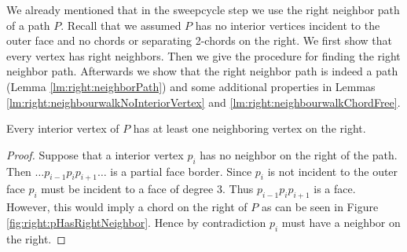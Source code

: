     We already mentioned that in the sweepcycle step we use the right neighbor path of a path $P$. Recall that we assumed $P$ has no interior vertices incident to the outer face and no chords or separating 2-chords on the right.
    We first show that every vertex has right neighbors.
    Then we give the procedure for finding the right neighbor path.
    Afterwards we show that the right neighbor path is indeed a path (Lemma \ref{lm:right:neighborPath}) and some additional properties in Lemmas \ref{lm:right:neighbourwalkNoInteriorVertex} and \ref{lm:right:neighbourwalkChordFree}.

    \begin{lemma}
      \label{lm:right:pHasRightNeihgbours}
      Every interior vertex of $P$ has at least one neighboring vertex on the right.
    \end{lemma}

    \begin{proof}
      Suppose that a interior vertex $p_i$ has no neighbor on the right of the path. Then $ \ldots p_{i-1} p_i p_{i+1} \ldots $ is a partial face border. Since $p_i$ is not incident to the outer face $p_i$ must be incident to a face of degree $3$. Thus $p_{i-1} p_i p_{i+1}$ is a face. However, this would imply a chord on the right of $P$ as can be seen in Figure \ref{fig:right:pHasRightNeighbor}. Hence by contradiction $p_i$ must have a neighbor on the right.
    \end{proof}

